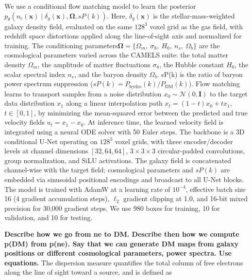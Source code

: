 \documentclass[twocolumn]{aastex631}
\begin{document}
We use a conditional flow matching model to learn the posterior $p_\theta(n_e(\mathbf{x}) \mid \delta_g(\mathbf{x}), \mathbf{\Omega}, sP(k))$. Here, $\delta_g(\mathbf{x})$ is the stellar-mass-weighted galaxy density field, evaluated on the same $128^3$ voxel grid as the gas field, with redshift space distortions applied along the line-of-sight axis and normalized for training. The conditioning parameters$
\boldsymbol{\Omega} = \{\Omega_m,\ \sigma_8,\ H_0,\ n_s,\ \Omega_b\}$
are the cosmological parameters varied across the CAMELS suite: the total matter density $\Omega_m$, the amplitude of matter fluctuations $\sigma_8$, the Hubble constant $H_0$, the scalar spectral index $n_s$, and the baryon density $\Omega_b$. sP(k) is the ratio of baryon power spectrum suppression ($sP(k) = P_\mathrm{hydro}(k)/P_\mathrm{DM}(k)$). Flow matching learns to transport samples from a noise distribution $x_0 \sim \mathcal{N}(0, \mathbf{I})$ to the target data distribution $x_1$ along a linear interpolation path $x_t = (1-t)x_0 + t x_1$, $t \in [0,1]$, by minimizing the mean-squared error between the predicted and true velocity fields $u_t = x_1 - x_0$. At inference time, the learned velocity field is integrated using a neural ODE solver with 50 Euler steps. The backbone is a 3D conditional U-Net operating on $128^3$ voxel grids, with three encoder/decoder levels at channel dimensions $[32, 64, 64]$, $3\times3\times3$ circular-padded convolutions, group normalization, and SiLU activations. The galaxy field is concatenated channel-wise with the target field; cosmological parameters and $sP(k)$ are embedded via sinusoidal positional encodings and broadcast to all U-Net blocks. The model is trained with AdamW at a learning rate of $10^{-4}$, effective batch size 16 (4 gradient accumulation steps), $\ell_2$ gradient clipping at 1.0, and 16-bit mixed precision for 30,000 gradient steps. We use 980 boxes for training, 10 for validation, and 10 for testing.

\textbf{Describe how we go from ne to DM. Describe then how we compute p(DM) from p(ne). Say that we can 
generate DM maps from galaxy positions or different cosmological parameters, 
power spectra. Use equations.}
The dispersion measure quantifies the total column of free electrons along the line of sight toward a source, and is defined as
\end{document}
